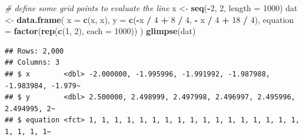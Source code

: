 \documentclass[
]{book}
\newenvironment{Shaded}{\begin{snugshade}}{\end{snugshade}}
\newcommand{\CommentTok}[1]{\textcolor[rgb]{0.56,0.35,0.01}{\textit{#1}}}
\newcommand{\DataTypeTok}[1]{\textcolor[rgb]{0.13,0.29,0.53}{#1}}
\newcommand{\DecValTok}[1]{\textcolor[rgb]{0.00,0.00,0.81}{#1}}
\newcommand{\FloatTok}[1]{\textcolor[rgb]{0.00,0.00,0.81}{#1}}
\newcommand{\KeywordTok}[1]{\textcolor[rgb]{0.13,0.29,0.53}{\textbf{#1}}}
\newcommand{\NormalTok}[1]{#1}
\newcommand{\OperatorTok}[1]{\textcolor[rgb]{0.81,0.36,0.00}{\textbf{#1}}}
\newcommand{\StringTok}[1]{\textcolor[rgb]{0.31,0.60,0.02}{#1}}
\theoremstyle{definition}
\theoremstyle{definition}
\theoremstyle{definition}
\theoremstyle{definition}
\theoremstyle{remark}
\begin{document}
\begin{Shaded}
\begin{Highlighting}[]
\CommentTok{# define some grid points to evaluate the line}
\NormalTok{x <-}\StringTok{ }\KeywordTok{seq}\NormalTok{(}\OperatorTok{-}\DecValTok{2}\NormalTok{, }\DecValTok{2}\NormalTok{, }\DataTypeTok{length =} \DecValTok{1000}\NormalTok{)}
\NormalTok{dat <-}\StringTok{ }\KeywordTok{data.frame}\NormalTok{(}
    \DataTypeTok{x =} \KeywordTok{c}\NormalTok{(x, x),}
    \DataTypeTok{y =} \KeywordTok{c}\NormalTok{(}\OperatorTok{-}\NormalTok{x }\OperatorTok{/}\StringTok{ }\DecValTok{4} \OperatorTok{+}\StringTok{ }\DecValTok{8} \OperatorTok{/}\StringTok{ }\DecValTok{4}\NormalTok{, }\OperatorTok{-}\StringTok{ }\NormalTok{x }\OperatorTok{/}\StringTok{ }\DecValTok{4} \OperatorTok{+}\StringTok{ }\DecValTok{18} \OperatorTok{/}\StringTok{ }\DecValTok{4}\NormalTok{),}
    \DataTypeTok{equation =} \KeywordTok{factor}\NormalTok{(}\KeywordTok{rep}\NormalTok{(}\KeywordTok{c}\NormalTok{(}\DecValTok{1}\NormalTok{, }\DecValTok{2}\NormalTok{), }\DataTypeTok{each =} \DecValTok{1000}\NormalTok{))}
\NormalTok{)}
\KeywordTok{glimpse}\NormalTok{(dat)}
\end{Highlighting}
\end{Shaded}

\begin{verbatim}
## Rows: 2,000
## Columns: 3
## $ x        <dbl> -2.000000, -1.995996, -1.991992, -1.987988, -1.983984, -1.979~
## $ y        <dbl> 2.500000, 2.498999, 2.497998, 2.496997, 2.495996, 2.494995, 2~
## $ equation <fct> 1, 1, 1, 1, 1, 1, 1, 1, 1, 1, 1, 1, 1, 1, 1, 1, 1, 1, 1, 1, 1~
\end{verbatim}

\begin{Shaded}
\end{Shaded}
\end{document}
